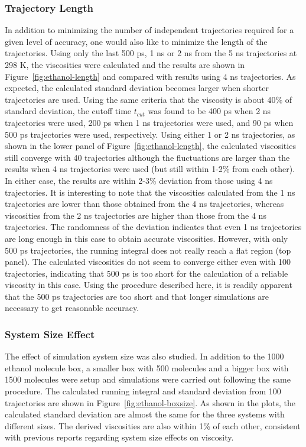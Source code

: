 \documentclass[12pt]{article}
\begin{document}
\subsubsection{Trajectory Length}
In addition to minimizing the number of independent trajectories required for a given level of accuracy, one would also like to minimize the length of the trajectories. 
Using only the last 500 ps, 1 ns or 2 ns from the 5 ns trajectories at 298 K,
the viscosities were calculated and the results are shown in Figure~\ref{fig:ethanol-length}
and compared with results using 4 ns trajectories.
As expected, the calculated standard deviation becomes larger when shorter trajectories are used.
Using the same criteria that the viscosity is about 40\% of standard deviation,
the cutoff time $t_{cut}$ was found to be 400 ps when 2 ns trajectories were used,
200 ps when 1 ns trajectories were used, 
and 90 ps when 500 ps trajectories were used, respectively.
Using either 1 or 2 ns trajectories,
as shown in the lower panel of Figure~\ref{fig:ethanol-length},
the calculated viscosities still converge with 40 trajectories
although the fluctuations are larger than the results when 4 ns trajectories were used
(but still within 1-2\% from each other).
In either case, the results are within 2-3\% deviation from those using 4 ns trajectories.
It is interesting to note that the viscosities calculated from the 1 ns trajectories are lower than those obtained from the 4 ns trajectories, 
whereas viscosities from the 2 ns trajectories are higher than those from the 4 ns trajectories.
The randomness of the deviation indicates that even 1 ns trajectories are long enough in this case to obtain accurate viscosities.
However, with only 500 ps trajectories,
the running integral does not really reach a flat region (top panel).
The calculated viscosities do not seem to converge either even with 100 trajectories,
indicating that 500 ps is too short for the calculation of a reliable viscosity in this case. Using the procedure described here, it is readily apparent that the 500 ps trajectories are too short and that longer simulations are necessary to get reasonable accuracy. 

\subsubsection{System Size Effect}

The effect of simulation system size was also studied.
In addition to the 1000 ethanol molecule box,
a smaller box with 500 molecules and a bigger box with 1500 molecules were setup
and simulations were carried out following the same procedure.
The calculated running integral and standard deviation from 100 trajectories are shown in Figure~\ref{fig:ethanol-boxsize}.
As shown in the plots,
the calculated standard deviation are almost the same for the three systems with different sizes.
The derived viscosities are also within 1\% of each other,
consistent with previous reports regarding system size effects on viscosity.
\cite{Alfe.PRL.81.5161.1998,
Hummer.JPCB.108.15873.2004,
Andreussi.JCP.137.044508.2012}
\end{document}
